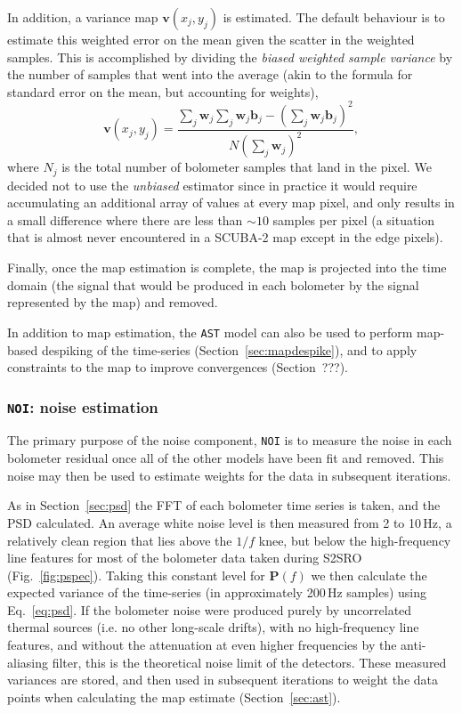 \documentclass[useAMS,usenatbib,nofootinbib]{mn2e}
\begin{document}
In addition, a variance map $\mathbf{v}(x_j,y_j)$ is estimated. The
default behaviour is to estimate this weighted error on the mean given
the scatter in the weighted samples. This is accomplished by dividing
the \emph{biased weighted sample variance} by the number of samples
that went into the average (akin to the formula for standard error on
the mean, but accounting for weights),
%
\begin{equation}
\mathbf{v}(x_j,y_j) = \frac{\sum_j \mathbf{w}_j
                            \sum_j \mathbf{w}_j \mathbf{b}_j -
                            \left( \sum_j \mathbf{w}_j \mathbf{b}_j \right)^2 }
                           { N \left( \sum_j \mathbf{w}_j \right)^2 },
\end{equation}
%
where $N_j$ is the total number of bolometer samples that land in the
pixel. We decided not to use the \emph{unbiased} estimator since in
practice it would require accumulating an additional array of values
at every map pixel, and only results in a small difference where there
are less than $\sim10$ samples per pixel (a situation that is almost
never encountered in a SCUBA-2 map except in the edge pixels).

Finally, once the map estimation is complete, the map is projected
into the time domain (the signal that would be produced in each
bolometer by the signal represented by the map) and removed.

In addition to map estimation, the \texttt{AST} model can also be used
to perform map-based despiking of the time-series
(Section~\ref{sec:mapdespike}), and to apply constraints to the map to
improve convergences (Section~???).

\subsubsection{\texttt{NOI}: noise estimation}
\label{sec:noi}

The primary purpose of the noise component, \texttt{NOI} is to measure
the noise in each bolometer residual once all of the other models have
been fit and removed. This noise may then be used to estimate weights
for the data in subsequent iterations.

As in Section~\ref{sec:psd} the FFT of each bolometer time series is
taken, and the PSD calculated. An average white noise level is then
measured from 2 to 10\,Hz, a relatively clean region that lies above
the $1/f$ knee, but below the high-frequency line features for most of
the bolometer data taken during S2SRO (Fig.~\ref{fig:pspec}). Taking
this constant level for $\mathbf{P}(f)$ we then calculate the expected
variance of the time-series (in approximately 200\,Hz samples) using
Eq.~\ref{eq:psd}. If the bolometer noise were produced purely by
uncorrelated thermal sources (i.e. no other long-scale drifts), with
no high-frequency line features, and without the attenuation at even
higher frequencies by the anti-aliasing filter, this is the
theoretical noise limit of the detectors. These measured variances are
stored, and then used in subsequent iterations to weight the data
points when calculating the map estimate (Section~\ref{sec:ast}).
\end{document}
